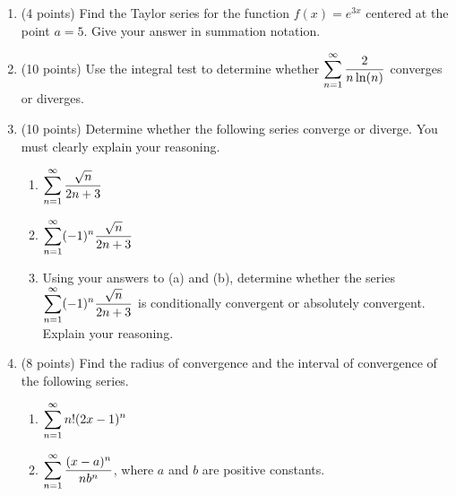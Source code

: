 \documentclass[11pt,fleqn]{article}
\begin{document}
\begin{enumerate}
  \begin{multicols}{2}{
      \vspace*{-0.45in}
      \begin{enumerate}[a)]
      \item $\d \sum_{n = 1}^{\infty} (-3)^{n+1}5^{-n}$
      \item $\d \sum_{n = 0}^{\infty} \frac{(-1)^n }{2^n n!}$
      \end{enumerate}}
  \end{multicols}
  
\vfill
\newpage
  \item (4 points) Find the Taylor series for the function $f(x) = e^{3x}$
    centered at the point $a = 5$. Give your answer in summation
    notation. 
\vfill


\item (10 points) Use the integral test to determine whether $\displaystyle
    \sum_{n=1}^{\infty} \frac{2}{n \ln(n)} $ converges or diverges. 
\vfill
\newpage
\item (10 points) Determine whether the following series converge or
  diverge. You must clearly explain your reasoning. 
  \begin{enumerate}
  \item $\displaystyle \sum_{n=1}^{\infty} \frac{\sqrt n}{2n +3}$
\vskip1in
\vfill
  \item  $\displaystyle \sum_{n=1}^{\infty} (-1)^n \frac{\sqrt n}{2n +3}$
\vskip1.86in
\vfill
  \item Using your answers to (a) and (b), determine whether the
    series $\displaystyle \sum_{n=1}^{\infty} (-1)^n \frac{\sqrt n}{2n +3}$ is
    conditionally convergent or absolutely convergent. Explain your
    reasoning. 
\vfill
  \end{enumerate}



\newpage

\item (8 points) Find the radius of convergence and the interval of convergence
  of the following series. 

  \begin{enumerate}
  \item $\displaystyle \sum_{n=1}^{\infty} n! ( 2x - 1)^n$
\vskip2in
  \item $\displaystyle \sum_{n=1}^{\infty} \frac{(x-a)^n}{n b^n}$, where $a$ and
    $b$ are positive constants.
  \end{enumerate}






\end{enumerate}
\end{document}
